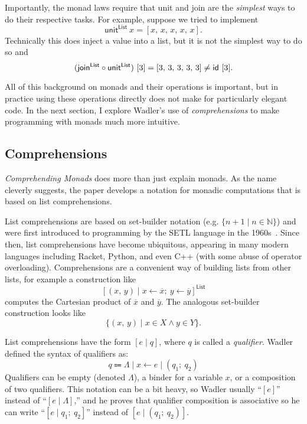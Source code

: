 \documentclass[acmsmall, nonacm, screen]{acmart}
\newcommand{\unit}[2]{\textsf{unit}^{\textsf{#1}}~#2}
\begin{document}
Importantly, the monad laws require that \textsf{unit} and \textsf{join} are the {\em simplest}
ways to do their respective tasks. For example, suppose we tried to implement
\[ \unit{List}{x} = [x,\, x,\, x,\, x,\, x]. \]
Technically this does inject a value into a list, but it is not the simplest way to do so and
\[
  (\textsf{join}^{\textsf{List}} \circ \textsf{unit}^{\textsf{List}})~[3] = [3,\, 3,\, 3,\, 3,\, 3] \neq \textsf{id}~[3]. \\
\]

All of this background on monads and their operations is important, but in practice using these
operations directly does not make for particularly elegant code. In the next section, I explore
Wadler's use of {\em comprehensions} to make programming with monads much more intuitive.

\subsection{Comprehensions}
{\em Comprehending Monads} does more than just explain monads. As the name cleverly suggests, the
paper develops a notation for monadic computations that is based on list comprehensions.

List comprehensions are based on set-builder notation (e.g. $\{n + 1 \mid n \in \mathbb{N}\}$)
and were first introduced to programming by the SETL language in the
1960s~\cite{schwartz2012programming}. Since then, list comprehensions have become ubiquitous,
appearing in many modern languages including Racket, Python, and even C++ (with some abuse of
operator overloading). Comprehensions are a convenient way of building lists from other lists,
for example a construction like
\[ [(x,\, y) \mid x \leftarrow \overline{x};\ y \leftarrow \overline{y}]^{\textsf{List}} \]
computes the Cartesian product of $\overline{x}$ and $\overline{y}$. The analogous set-builder
construction looks like
\[ \{(x,\, y) \mid x \in X \wedge y \in Y\}. \]

List comprehensions have the form $[e \mid q]$, where $q$ is called a {\em qualifier}. Wadler
defined the syntax of qualifiers as:
\[ q \Coloneqq \Lambda \mid x \leftarrow e \mid (q_1;\ q_2) \]
Qualifiers can be empty (denoted $\Lambda$), a binder for a variable $x$, or a composition of two
qualifiers. This notation can be a bit heavy, so Wadler usually ``$[e]$'' instead of ``$[e \mid
\Lambda]$,'' and he proves that qualifier composition is associative so he can write ``$[e \mid
q_1;\ q_2]$'' instead of $[e \mid (q_1;\ q_2)]$.
\end{document}
